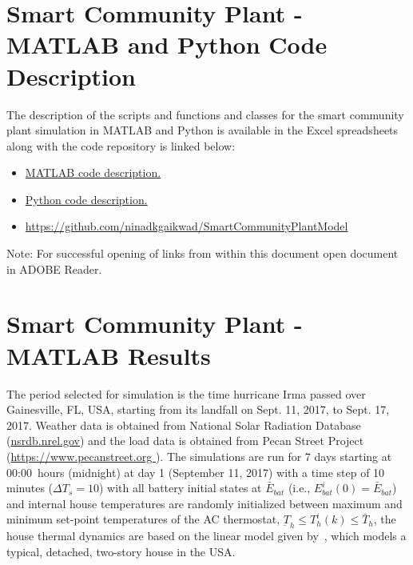 \documentclass[11pt,usenames]{article}
\begin{document}
\newpage

\section{Smart Community Plant - MATLAB and Python Code Description}\label{section:PlantMATLABPython}

The description of the scripts and functions and classes for the smart community plant simulation in MATLAB and Python is available in the Excel spreadsheets along with the code repository is linked below:

\begin{itemize}
	\item \href{{run:./ExcelFiles/MATLABFunctions.xlsx}}{MATLAB code description.}
	\item \href{{run:./ExcelFiles/PythonModules.xlsx}}{Python code description.}
	\item \url{https://github.com/ninadkgaikwad/SmartCommunityPlantModel} 
\end{itemize}


Note: For successful opening of links from within this document open document in ADOBE Reader.



\newpage

\section{Smart Community Plant - MATLAB Results}\label{section:PlantMATLABResults}
The period selected for simulation is the time hurricane Irma passed over Gainesville, FL, USA, starting from its landfall on Sept. 11, 2017, to Sept. 17, 2017. Weather data is obtained from National Solar Radiation Database (\url{nsrdb.nrel.gov}) and the load data is obtained from Pecan Street Project (\url{https://www.pecanstreet.org
}). The simulations are run for 7 days starting at 00:00~hours (midnight) at day 1 (September 11, 2017)  with a time step of 10 minutes ($\Delta T_{s}=10 $) with all battery initial states at $\bar E_{bat}$ (i.e., $E_{bat}^{i}(0)=\bar E_{bat}$) and  internal house temperatures are randomly initialized between maximum and minimum set-point temperatures of the AC thermostat, $\underbar T_{h}\leq T_{h}^{i}(k)\leq \bar T_{h}$, the house thermal dynamics are based on the linear model given by~\cite{CuiHybrid:2019}, which models a typical, detached, two-story house in the USA.

\newpage
\end{document}
